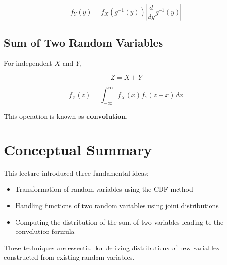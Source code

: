 \documentclass[12pt]{article}
\begin{document}
\[
f_Y(y) =
f_X(g^{-1}(y))
\left|
\frac{d}{dy}g^{-1}(y)
\right|
\]

\subsection{Sum of Two Random Variables}

For independent $X$ and $Y$,

\[
Z=X+Y
\]

\[
f_Z(z)=
\int_{-\infty}^{\infty}
f_X(x)f_Y(z-x)\,dx
\]

This operation is known as \textbf{convolution}.

\section{Conceptual Summary}

This lecture introduced three fundamental ideas:

\begin{itemize}
\item Transformation of random variables using the CDF method
\item Handling functions of two random variables using joint distributions
\item Computing the distribution of the sum of two variables leading to the convolution formula
\end{itemize}

These techniques are essential for deriving distributions of new variables constructed from existing random variables.
\end{document}
